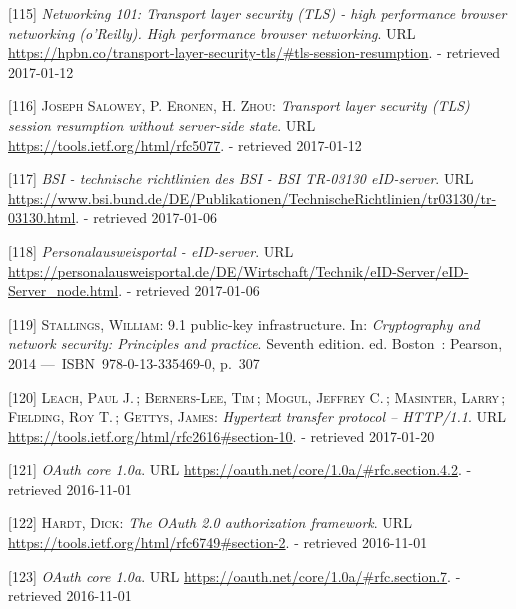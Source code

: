 \documentclass[12pt,english,a4paper,titlepage,cleardoublepage=empty,dottedtoc]{report}
\begin{document}
\hypertarget{ref-book_2013_networking-101_tls-session-resumption}{}
{[}115{]} \emph{Networking 101: Transport layer security (TLS) - high
performance browser networking (o'Reilly). High performance browser
networking}. URL
\url{https://hpbn.co/transport-layer-security-tls/\#tls-session-resumption}.
- retrieved 2017-01-12

\hypertarget{ref-web_spec_tls-session-ticket-resumption}{}
{[}116{]} \textsc{Joseph Salowey, P. Eronen, \textnormal{H. Zhou}}:
\emph{Transport layer security (TLS) session resumption without
server-side state}. URL \url{https://tools.ietf.org/html/rfc5077}. -
retrieved 2017-01-12

\hypertarget{ref-web_bsi-spec_eid}{}
{[}117{]} \emph{BSI - technische richtlinien des BSI - BSI TR-03130
eID-server}. URL
\url{https://www.bsi.bund.de/DE/Publikationen/TechnischeRichtlinien/tr03130/tr-03130.html}.
- retrieved 2017-01-06

\hypertarget{ref-web_2017_npa-eid-server}{}
{[}118{]} \emph{Personalausweisportal - eID-server}. URL
\url{https://personalausweisportal.de/DE/Wirtschaft/Technik/eID-Server/eID-Server_node.html}.
- retrieved 2017-01-06

\hypertarget{ref-book_2014_chapter-10-5-asym-random-number-gen}{}
{[}119{]} \textsc{Stallings, William}: 9.1 public-key infrastructure.
In: \emph{Cryptography and network security: Principles and practice}.
Seventh edition. ed. Boston~: Pearson, 2014 ---~ISBN~978-0-13-335469-0,
p.~307

\hypertarget{ref-web_spec_http-error-codes}{}
{[}120{]} \textsc{Leach, Paul J.}\,; \textsc{Berners-Lee, Tim}\,;
\textsc{Mogul, Jeffrey C.}\,; \textsc{Masinter, Larry}\,;
\textsc{Fielding, Roy T.}\,; \textsc{Gettys, James}: \emph{Hypertext
transfer protocol -- HTTP/1.1}. URL
\url{https://tools.ietf.org/html/rfc2616\#section-10}. - retrieved
2017-01-20

\hypertarget{ref-web_spec_oauth-1a_client-reg}{}
{[}121{]} \emph{OAuth core 1.0a}. URL
\url{https://oauth.net/core/1.0a/\#rfc.section.4.2}. - retrieved
2016-11-01

\hypertarget{ref-web_spec_oauth-2_client-reg}{}
{[}122{]} \textsc{Hardt, Dick}: \emph{The OAuth 2.0 authorization
framework}. URL \url{https://tools.ietf.org/html/rfc6749\#section-2}. -
retrieved 2016-11-01

\hypertarget{ref-web_spec_oauth-1a_access-verification}{}
{[}123{]} \emph{OAuth core 1.0a}. URL
\url{https://oauth.net/core/1.0a/\#rfc.section.7}. - retrieved
2016-11-01
\end{document}
